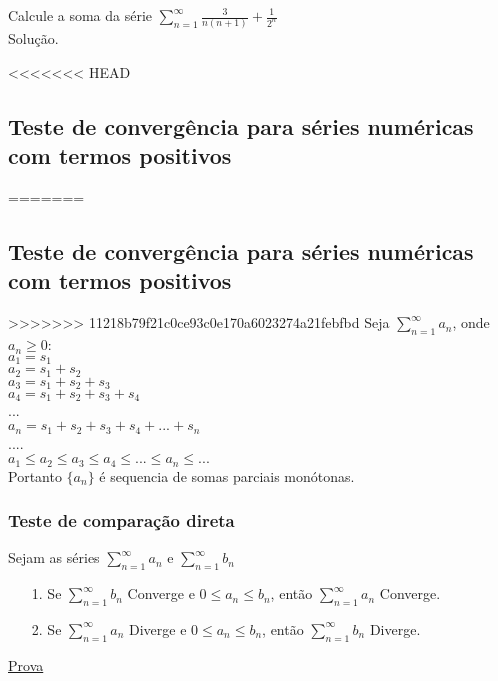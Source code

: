 \begin{ex}
	Calcule a soma da série $\sum_{n=1}^{\infty}\frac{3}{n(n+1)}+\frac{1}{2^{n}}$ \\
	Solução.
\end{ex}
<<<<<<< HEAD
\vspace*{5cm}
\subsection{Teste de convergência para séries numéricas com termos positivos}

=======

\subsection{Teste de convergência para séries numéricas com termos positivos}
>>>>>>> 11218b79f21c0ce93c0e170a6023274a21febfbd
Seja $\sum_{n=1}^{\infty}a_{n}$, onde $a_{n}\geq 0$:\\
$a_{1}=s_{1}$\\
$a_{2}=s_{1}+s_{2}$\\
$a_{3}=s_{1}+s_{2}+s_{3}$\\
$a_{4}=s_{1}+s_{2}+s_{3}+s_{4}$\\
...\\
$a_{n}=s_{1}+s_{2}+s_{3}+s_{4}+...+s_{n}$\\
....\\

$a_{1}\leq a_{2}\leq a_{3} \leq a_{4}\leq ...\leq a_{n}\leq...$\\

Portanto $\{a_{n}\}$ é sequencia de somas parciais monótonas.
\subsubsection{Teste de comparação direta}
Sejam as séries $\sum_{n=1}^{\infty}a_{n}$ e $\sum_{n=1}^{\infty}b_{n}$\\
\begin{itemize}
	\item[1.] Se $\sum_{n=1}^{\infty}b_{n}$ Converge e $0\leq a_{n}\leq b_{n}$, então $\sum_{n=1}^{\infty}a_{n}$ Converge.
	
	\item[2.]Se $\sum_{n=1}^{\infty}a_{n}$ Diverge e $0\leq a_{n}\leq b_{n}$, então $\sum_{n=1}^{\infty}b_{n}$ Diverge.
\end{itemize}
\underline{Prova}\\
\vspace*{5cm}

